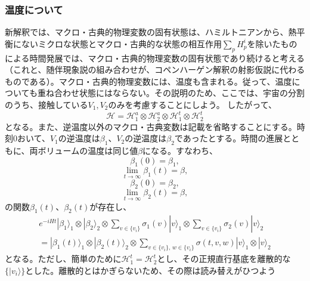 \subsubsection{温度について}
新解釈では、マクロ・古典的物理変数の固有状態は、ハミルトニアンから、熱平衡にないミクロな状態とマクロ・古典的な状態の相互作用$\sum_pH_p^i$を除いたものによる時間発展では、マクロ・古典的物理変数の固有状態であり続けると考える（これと、随伴現象説の組み合わせが、コペンハーゲン解釈の射影仮説に代わるものである）。マクロ・古典的物理変数には、温度も含まれる。従って、温度についても重ね合わせ状態にはならない。その説明のため、ここでは、宇宙の分割のうち、接触している${V_1,V_2}$のみを考慮することにしよう。 したがって、
\begin{equation}
    \mathcal{H} = \mathcal{H}_1^a \otimes \mathcal{H}_2^a \otimes \mathcal{H}_1^t \otimes \mathcal{H}_2^t 
\end{equation}
となる。また、逆温度以外のマクロ・古典変数は記載を省略することにする。時刻$0$おいて、$V_1$の逆温度は$\beta_1$、$V_2$の逆温度は$\beta_2$であったとする。時間の進展とともに、両ボリュームの温度は同じ値$\beta$になる。すなわち、
\begin{equation}
    \beta_1(0) = \beta_1,
\end{equation}
\begin{equation}
    \lim_{t \to \infty} \beta_1(t) = \beta,
\end{equation}
\begin{equation}
    \beta_2(0) = \beta_2,
\end{equation}
\begin{equation}
    \lim_{t \to \infty} \beta_2(t) = \beta,
\end{equation}
の関数$\beta_1(t)$、$\beta_2(t)$が存在し、
\begin{equation}
\begin{aligned}
    e^{-iHt}|\beta_1 \rangle_1 \otimes |\beta_2 \rangle_2 \otimes \sum_{v \in \{v_i\}} \sigma_1(v) |v\rangle_1 \otimes \sum_{v \in \{v_i\}}  \sigma_2(v) |v\rangle_2\\
    =  |\beta_1(t) \rangle_1 \otimes |\beta_2(t)\rangle_2 \otimes   \sum_{v \in \{v_i\} ,\, w \in \{v_i\}} \sigma(t,v,w)|v\rangle_1 \otimes |v\rangle_2
\end{aligned}
\end{equation}
となる。ただし、簡単のために$\mathcal{H}_1^t = \mathcal{H}_2^t$とし、その正規直行基底を離散的な$\{|v_i\rangle\}$とした。離散的とはかぎらないため、その際は読み替えがひつよう\\
　